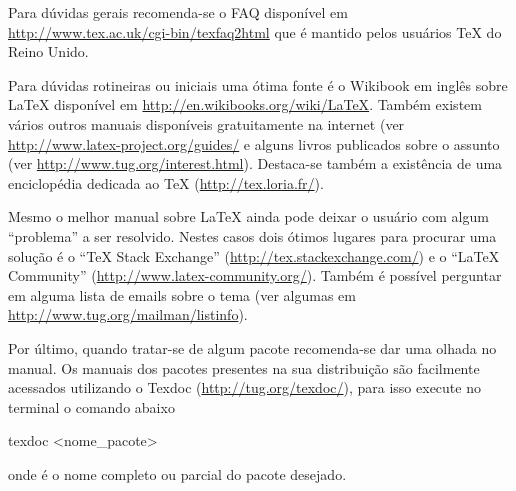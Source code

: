 Para d\'{u}vidas gerais recomenda-se o FAQ dispon\'{i}vel em \url{http://www.tex.ac.uk/cgi-bin/texfaq2html} que \'{e} mantido pelos usu\'{a}rios TeX do Reino Unido.

Para d\'{u}vidas rotineiras ou iniciais uma \'{o}tima fonte \'{e} o Wikibook em ingl\^{e}s sobre LaTeX dispon\'{i}vel em \url{http://en.wikibooks.org/wiki/LaTeX}. Tamb\'{e}m existem v\'{a}rios outros manuais dispon\'{i}veis gratuitamente na internet (ver \url{http://www.latex-project.org/guides/} e alguns livros publicados sobre o assunto (ver \url{http://www.tug.org/interest.html}). Destaca-se tamb\'{e}m a exist\^{e}ncia de uma enciclop\'{e}dia dedicada ao TeX (\url{http://tex.loria.fr/}).

Mesmo o melhor manual sobre LaTeX ainda pode deixar o usu\'{a}rio com algum ``problema'' a ser resolvido. Nestes casos dois \'{o}timos lugares para procurar uma solu\c{c}\~{a}o \'{e} o ``TeX Stack Exchange'' (\url{http://tex.stackexchange.com/}) e o ``LaTeX Community'' (\url{http://www.latex-community.org/}). Tamb\'{e}m \'{e} poss\'{i}vel perguntar em alguma lista de emails sobre o tema (ver algumas em \url{http://www.tug.org/mailman/listinfo}).

Por \'{u}ltimo, quando tratar-se de algum pacote recomenda-se dar uma olhada no manual. Os manuais dos pacotes presentes na sua distribui\c{c}\~{a}o s\~{a}o facilmente acessados utilizando o Texdoc (\url{http://tug.org/texdoc/}), para isso execute no terminal o comando abaixo
\begin{code}
texdoc <nome_pacote>
\end{code}
onde  \'{e} o nome completo ou parcial do pacote desejado.

